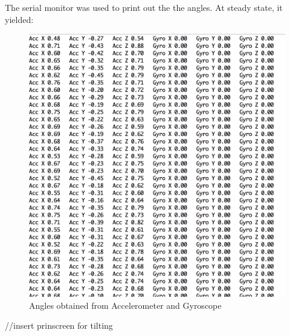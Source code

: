 The serial monitor was used to print out the the angles. At steady state, it yielded:

\begin{figure}[H]
  \centering
    \includegraphics[width=1\textwidth]{images/accgy.png}
	\caption{Angles obtained from Accelerometer and Gyroscope}
\end{figure}

//insert prinscreen for tilting 